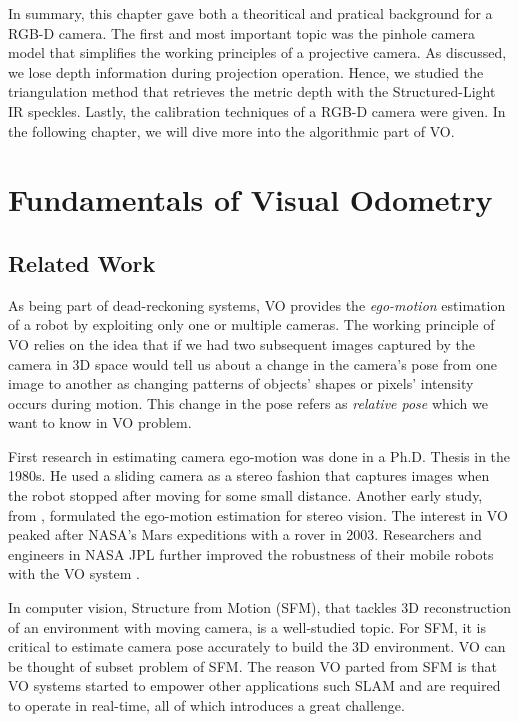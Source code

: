 \documentclass[a4paper]{report}
\numberwithin{figure}{section}
\begin{document}
In summary, this chapter gave both a theoritical and pratical background 
for a RGB-D camera. The first and most important topic was the pinhole 
camera model that simplifies the working principles of a projective camera. 
As discussed, we lose depth information during projection operation. Hence, 
we studied the triangulation method that retrieves the metric depth 
with the Structured-Light IR speckles. Lastly, the calibration techniques of 
a RGB-D camera were given. In the following chapter, we will dive more 
into the algorithmic part of VO.

\chapter{Fundamentals of Visual Odometry} \label{cp_vo}

\section{Related Work} \label{sc_visual_odometry_related_works}

As being part of dead-reckoning systems, VO provides the \textit{ego-motion}
estimation of a robot by exploiting only one or multiple cameras. The working
principle of VO relies on the idea that if we had two subsequent images
captured by the camera in 3D space would tell us about a change in the camera's
pose from one image to another as changing patterns of objects' shapes or
pixels' intensity occurs during motion.  This change in the pose refers as
\textit{relative pose} which we want to know in VO problem.

First research in estimating camera ego-motion was done in a Ph.D. Thesis 
\parencite{Moravec1980} in the 1980s. He used a sliding camera as a stereo 
fashion 
that captures images when the robot stopped after moving for some small 
distance. Another early study, from  
\parencite{Matthies1987a}, 
formulated the ego-motion estimation for stereo vision. The interest in VO 
peaked after NASA's Mars expeditions with a rover in 2003. Researchers and 
engineers in NASA JPL further improved the robustness of their mobile robots 
with the VO system \parencite{Olson2003}.

In computer vision, Structure from Motion (SFM), that tackles 3D 
reconstruction of an environment with moving camera, is a well-studied topic. 
For SFM, it is critical to estimate camera pose accurately to build the 3D 
environment. VO can be thought of subset problem of SFM. The reason VO parted 
from SFM is that VO systems started to empower other applications such SLAM 
and are required to operate in real-time, all of which introduces a great 
challenge.
\end{document}
